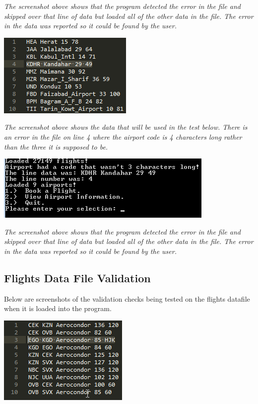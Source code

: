 \documentclass[10pt, a4paper]{article}
\begin{document}
\textit{The screenshot above shows that the program detected the error in the file and skipped over that line of data but loaded all of the other data in the file. The error in the data was reported so it could be found by the user.}

\newpage

\includegraphics{Data3.png}

\textit{The screenshot above shows the data that will be used in the test below. There is an error in the file on line 4 where the airport code is 4 characters long rather than the three it is supposed to be.}

\includegraphics{DataValidation3.png}

\textit{The screenshot above shows that the program detected the error in the file and skipped over that line of data but loaded all of the other data in the file. The error in the data was reported so it could be found by the user.}

\newpage

\subsection{Flights Data File Validation}
Below are screenshots of the validation checks being tested on the flights datafile when it is loaded into the program.

\includegraphics{Data4.png}
\end{document}
